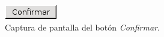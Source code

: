   \begin{figure}[!ht]
    \begin{center}
      \includegraphics[scale=0.6]{12.Disenyo_Interfaz/12.3.Gestion_Informacion/12.3.4.Eliminacion_Elementos/botonConfirmar.png}
      \caption{Captura de pantalla del botón \textit{Confirmar}.}
      \label{capturaBotonConfirmar}
    \end{center}
  \end{figure}
